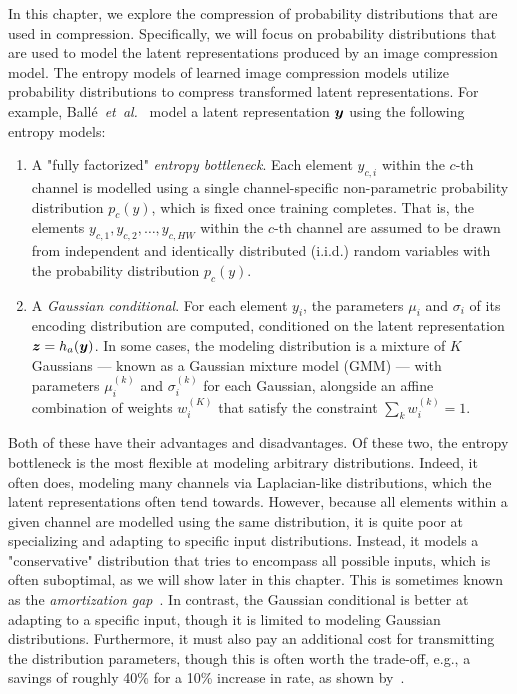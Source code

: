 In this chapter, we explore the compression of probability distributions that are used in compression.
Specifically, we will focus on probability distributions that are used to model the latent representations produced by an image compression model.
The entropy models of learned image compression models utilize probability distributions to compress transformed latent representations.
For example, Ballé~\emph{et~al.}~\cite{balle2018variational} model a latent representation ${\boldsymbol{y}}$ using the following entropy models:
\begin{enumerate}
  \item
    A "fully factorized" \emph{entropy bottleneck}. %
    Each element ${y}_{c,i}$ within the $c$-th channel is modelled using a single channel-specific non-parametric probability distribution ${p}_{c}(y)$, which is fixed once training completes.
    That is, the elements ${y}_{c,1}, {y}_{c,2}, \ldots, {y}_{c,H W}$ within the $c$-th channel are assumed to be drawn from independent and identically distributed (i.i.d.) random variables with the probability distribution ${p}_c(y)$.
  \item
    A \emph{Gaussian conditional}.
    For each element ${y}_{i}$, the parameters ${\mu}_{i}$ and ${\sigma}_{i}$ of its encoding distribution are computed, conditioned on the latent representation ${\boldsymbol{z}} = h_a({\boldsymbol{y}})$.
    In some cases, the modeling distribution is a mixture of $K$ Gaussians --- known as a Gaussian mixture model (GMM) --- with parameters ${\mu}_{i}^{(k)}$ and ${\sigma}_{i}^{(k)}$ for each Gaussian, alongside an affine combination of weights ${w}_{i}^{(K)}$ that satisfy the constraint $\sum_k {w}_{i}^{(k)} = 1$.
\end{enumerate}
Both of these have their advantages and disadvantages.
Of these two, the entropy bottleneck is the most flexible at modeling arbitrary distributions.
Indeed, it often does, modeling many channels via Laplacian-like distributions, which the latent representations often tend towards.
However, because all elements within a given channel are modelled using the same distribution, it is quite poor at specializing and adapting to specific input distributions.
Instead, it models a "conservative" distribution that tries to encompass all possible inputs, which is often suboptimal, as we will show later in this chapter.
This is sometimes known as the \emph{amortization gap}~\cite{balcilar2022amortizationgap,cremer2018inferencesuboptimality}.
In contrast, the Gaussian conditional is better at adapting to a specific input, though it is limited to modeling Gaussian distributions.
Furthermore, it must also pay an additional cost for transmitting the distribution parameters, though this is often worth the trade-off, e.g., a savings of roughly 40\% for a 10\% increase in rate, as shown by~\cite{balle2018variational}.

